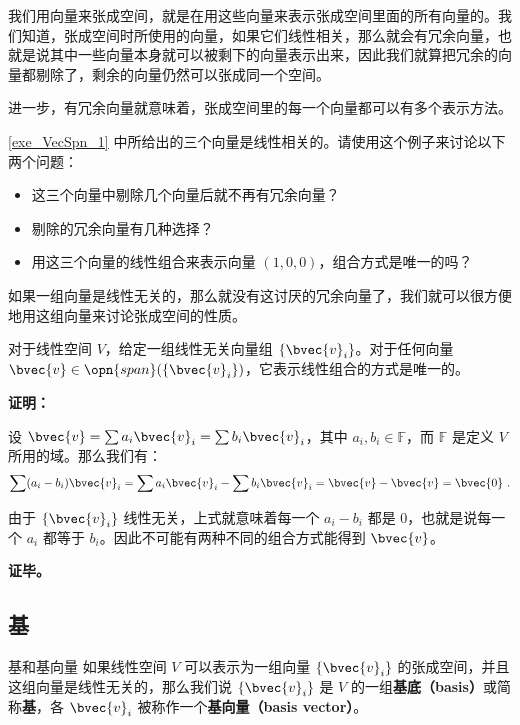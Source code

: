 

我们用向量来张成空间，就是在用这些向量来表示张成空间里面的所有向量的。我们知道，张成空间时所使用的向量，如果它们线性相关，那么就会有冗余向量，也就是说其中一些向量本身就可以被剩下的向量表示出来，因此我们就算把冗余的向量都剔除了，剩余的向量仍然可以张成同一个空间。

进一步，有冗余向量就意味着，张成空间里的每一个向量都可以有多个表示方法。

\begin{exercise}{}
\autoref{exe_VecSpn_1} 中所给出的三个向量是线性相关的。请使用这个例子来讨论以下两个问题：
\begin{itemize}
\item 这三个向量中剔除几个向量后就不再有冗余向量？
\item 剔除的冗余向量有几种选择？
\item 用这三个向量的线性组合来表示向量 $(1,0,0)$，组合方式是唯一的吗？
\end{itemize}
\end{exercise}

如果一组向量是线性无关的，那么就没有这讨厌的冗余向量了，我们就可以很方便地用这组向量来讨论张成空间的性质。

\begin{theorem}{}
对于线性空间 $V$，给定一组线性无关向量组 $\{\bvec{v}_i\}$。对于任何向量 $\bvec{v} \in \opn{span}(\{\bvec{v}_i\})$，它表示线性组合的方式是唯一的。
\end{theorem}
\textbf{证明：}

设 $\bvec{v} = \sum a_i \bvec{v}_i = \sum b_i \bvec{v}_i$，其中 $a_i, b_i\in \mathbb{F}$，而 $\mathbb{F}$ 是定义 $V$ 所用的域。那么我们有：
\begin{equation}
\sum(a_i - b_i) \bvec{v}_i = \sum a_i \bvec{v}_i - \sum b_i \bvec{v}_i =  \bvec{v} - \bvec{v} =  \bvec{0}~.
\end{equation}

由于 $\{\bvec{v}_i\}$ 线性无关，上式就意味着每一个 $a_i-b_i$ 都是 $0$，也就是说每一个 $a_i$ 都等于 $b_i$。因此不可能有两种不同的组合方式能得到 $\bvec{v}$。

\textbf{证毕。}

\subsection{基}

\begin{definition}{基和基向量}\label{def_VecSpn_2}
如果线性空间 $V$ 可以表示为一组向量 $\{\bvec{v}_i\}$ 的张成空间，并且这组向量是线性无关的，那么我们说 $\{\bvec{v}_i\}$ 是 $V$ 的一组\textbf{基底（basis）}或简称\textbf{基}，各 $\bvec{v}_i$ 被称作一个\textbf{基向量（basis vector）}。
\end{definition}

